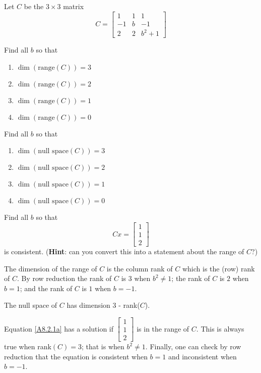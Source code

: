 \documentclass{ximera}
\begin{document}
\begin{exercise} \label{A8.2.1}
Let $C$ be the $3 \times 3$ matrix
\[
C=\begin{bmatrix} 
1 & 1 & 1 \\ 
-1 & b  &  -1 \\ 
2 & 2 & b^2+1 
\end{bmatrix}
\]
\begin{enumeratea}
\item Find all $b$ so that
	\begin{enumerate}
	\item $\dim(\text{range}(C))=3$
	\item $\dim(\text{range}(C))=2$
	\item $\dim(\text{range}(C))=1$
	\item $\dim(\text{range}(C))=0$
	\end{enumerate}

\item Find all $b$ so that
	\begin{enumerate}
	\item $\dim(\text{null space}(C))=3$
	\item $\dim(\text{null space}(C))=2$
	\item $\dim(\text{null space}(C))=1$
	\item $\dim(\text{null space}(C))=0$
	\end{enumerate}
	
\item Find all $b$ so that 
\begin{equation} \label{A8.2.1a}
Cx=\begin{bmatrix} 1 \\ 1 \\2 \end{bmatrix}
\end{equation}
is consistent. ({\bf Hint}: can you convert this into a statement about the range of $C$?)
\end{enumeratea}

\begin{solution}
\soln
\begin{enumeratea}
\item The dimension of the range of $C$ is the column rank of $C$ which is the (row) rank of $C$.  By row reduction the rank of $C$ is $3$ when $b^2\neq 1$; the rank of $C$ is $2$ when $b=1$; and the rank of $C$ is $1$ when $b=-1$. 

\item The null space of $C$ has dimension 3 - rank($C$).

\item Equation \eqref{A8.2.1a} has a solution if $\begin{bmatrix} 1 \\ 1 \\2 \end{bmatrix}$ is in the range of $C$.  This is always true when rank$(C) = 3$; that is when $b^2\neq 1$. Finally, one can check by row reduction that the equation is consistent when $b=1$ and inconsistent when $b=-1$.  
\end{enumeratea}

\end{solution}
\end{exercise}
\end{document}
